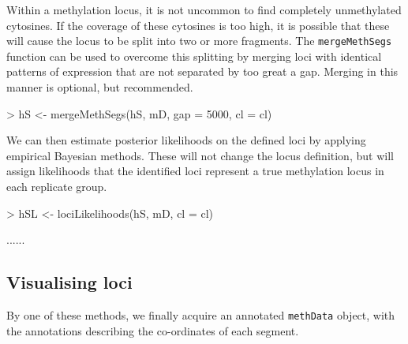 \documentclass[a4paper]{article}
\begin{document}
Within a methylation locus, it is not uncommon to find completely unmethylated cytosines. If the coverage of these cytosines is too high, it is possible that these will cause the locus to be split into two or more fragments. The \verb'mergeMethSegs' function can be used to overcome this splitting by merging loci with identical patterns of expression that are not separated by too great a gap. Merging in this manner is optional, but recommended.

\begin{Schunk}
\begin{Sinput}
> hS <- mergeMethSegs(hS, mD, gap = 5000, cl = cl)
\end{Sinput}
\end{Schunk}

We can then estimate posterior likelihoods on the defined loci by applying empirical Bayesian methods. These will not change the locus definition, but will assign likelihoods that the identified loci represent a true methylation locus in each replicate group.

\begin{Schunk}
\begin{Sinput}
> hSL <- lociLikelihoods(hS, mD, cl = cl)
\end{Sinput}
\begin{Soutput}
......
\end{Soutput}
\end{Schunk}




\subsection*{Visualising loci}

By one of these methods, we finally acquire an annotated \verb'methData' object, with the annotations describing the co-ordinates of each segment.
\end{document}

